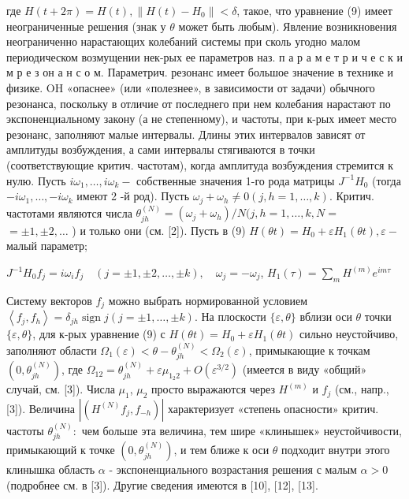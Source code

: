 \documentclass[10pt]{article}
\begin{document}
где $H(t+2 \pi)=H(t),\left\|H(t)-H_{0}\right\|<\delta$, такое, что уравнение (9) имеет неограниченные решения (знак у $\theta$ может быть любым). Явление возникновения неограниченно нарастающих колебаний системы при сколь угодно малом периодическом возмущении нек-рых ее параметров наз. п а р а м е т р и ч е с к и м р е з он а н с о м. Параметрич. резонанс имеет большое значение в технике и физике. $\mathrm{OH}$ «опаснее» (или «полезнее», в зависимости от задачи) обычного резонанса, поскольку в отличие от последнего при нем колебания нарастают по экспоненциальному закону (а не степенному), и частоты, при к-рых имеет место резонанс, заполняют малые интервалы. Длины этих интервалов зависят от амплитуды возбуждения, а сами интервалы стягиваются в точки (соответствующие критич. частотам), когда амплитуда возбуждения стремится к нулю. Пусть $i \omega_{1}, \ldots, i \omega_{k}-$ собственные значения 1-го рода матрицы $J^{-1} H_{0}$ (тогда $-i \omega_{1}, \ldots,-i \omega_{k}$ имеют 2 -й род). Пусть $\omega_{j}+\omega_{h} \neq 0(j, h=1, \ldots, k)$. Критич. частотами являются числа $\theta_{j h}^{(N)}=\left(\omega_{j}+\omega_{h}\right) / N(j, h=1, \ldots, k, N=$ $= \pm 1, \pm 2, \ldots$ ) и только они (см. [2]). Пусть в (9) $H(\theta t)=H_{0}+\varepsilon H_{1}(\theta t), \varepsilon-$ малый параметр;



$J^{-1} H_{0} f_{j}=i \omega_{i} f_{j} \quad(j= \pm 1, \pm 2, \ldots, \pm k), \quad \omega_{j}=-\omega_{j}$, $H_{1}(\tau)=\sum_{m} H^{(m)} e^{i m \tau}$



Систему векторов $f_{j}$ можно выбрать нормированной условием $\left\langle f_{j}, f_{h}\right\rangle=\delta_{j h} \operatorname{sign} j(j= \pm 1, \ldots, \pm k)$. На плоскости $\{\varepsilon, \theta\}$ вблизи оси $\theta$ точки $\{\varepsilon, \theta\}$, для к-рых уравнение (9) с $H(\theta t)=H_{0}+\varepsilon H_{1}(\theta t)$ сильно неустойчиво, заполняют области $\Omega_{1}(\varepsilon)<\theta-\theta_{j h}^{(N)}<\Omega_{2}(\varepsilon)$, примыкающие к точкам $\left(0, \theta_{j h}^{(N)}\right)$, где $\Omega_{12}=\theta_{j h}^{(N)}+\varepsilon \mu_{1_{2} 2}+O\left(\varepsilon^{3 / 2}\right)$ (имеется в виду «общий» случай, см. [3]). Числа $\mu_{1}$, $\mu_{2}$ просто выражаются через $H^{(m)}$ и $f_{j}$ (см., напр., [3]). Величина $\left|\left(H^{(N)} f_{j}, f_{-h}\right)\right|$ характеризует «степень опасности» критич. частоты $\theta_{j h}^{(N)}:$ чем больше эта величина, тем шире «клинышек» неустойчивости, примыкающий к точке $\left(0, \theta_{j h}^{(N)}\right)$, и тем ближе к оси $\theta$ подходит внутри этого клинышка область $\alpha$ - экспоненциального возрастания решения с малым $\alpha>0$ (подробнее см. в [3]). Другие сведения имеются в [10], [12], [13].
\end{document}
